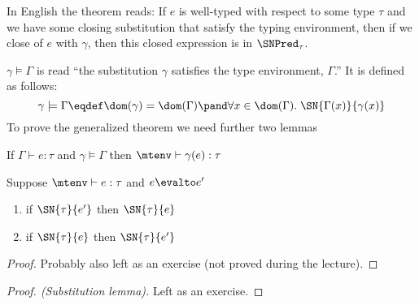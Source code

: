In English the theorem reads: If $e$ is well-typed with respect to some type $\tau$ and we have some closing substitution that satisfy the typing environment, then if we close of $e$ with $\gamma$, then this closed expression is in $\SNPred_\tau$.

$\gamma \models \Gamma$ is read ``the substitution $\gamma$ satisfies the type environment, $\Gamma$.'' It is defined as follows:
\[
  \gamma \models \Gamma \eqdef \dom(\gamma) = \dom(\Gamma) \pand
                 \forall x \in \dom(\Gamma). \; \SN{\Gamma(x)}{\gamma(x)}
\]
To prove the generalized theorem we need further two lemmas
\begin{substlem}
  If $\Gamma \vdash e : \tau$ and $\gamma \models \Gamma$ then $\mtenv \vdash \gamma (e) : \tau$
\end{substlem}
\begin{forback}
  Suppose $\mtenv \vdash e : \tau$ and $e \evalto e'$
  \begin{enumerate}
  \item if $\SN{\tau}{e'}$ then $\SN{\tau}{e}$
  \item if $\SN{\tau}{e}$ then $\SN{\tau}{e'}$
  \end{enumerate}
\end{forback}
\begin{proof}
  Probably also left as an exercise (not proved during the lecture).
\end{proof}
\begin{proof}[Proof. (Substitution lemma)]
  Left as an exercise.
\end{proof}
